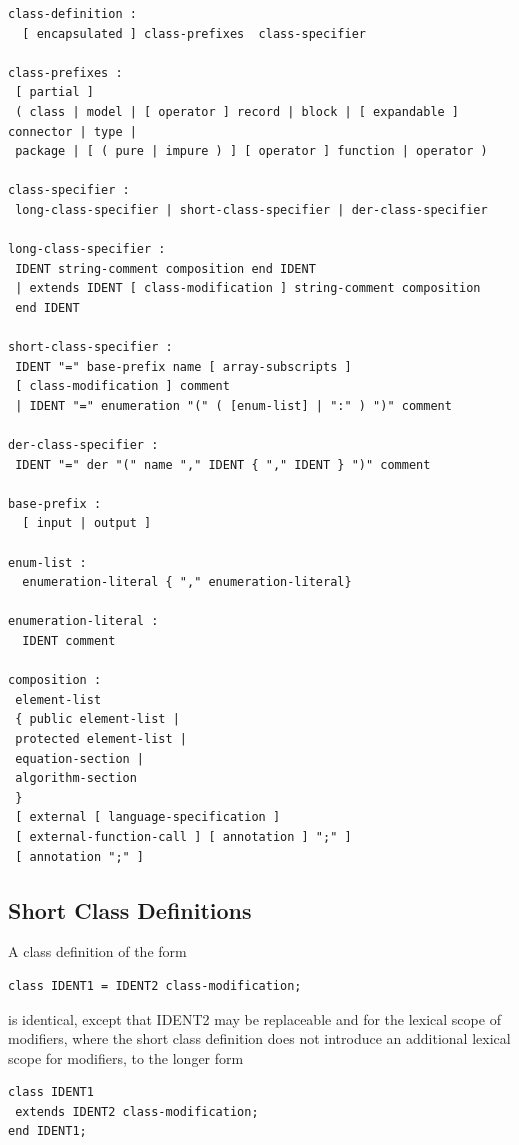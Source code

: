 \documentclass[10pt,a4paper]{report}
\begin{document}
\begin{lstlisting}[language=grammar]
class-definition : 
  [ encapsulated ] class-prefixes  class-specifier

class-prefixes :
 [ partial ]
 ( class | model | [ operator ] record | block | [ expandable ] connector | type |
 package | [ ( pure | impure ) ] [ operator ] function | operator )

class-specifier :
 long-class-specifier | short-class-specifier | der-class-specifier

long-class-specifier :
 IDENT string-comment composition end IDENT
 | extends IDENT [ class-modification ] string-comment composition
 end IDENT

short-class-specifier :
 IDENT "=" base-prefix name [ array-subscripts ]
 [ class-modification ] comment
 | IDENT "=" enumeration "(" ( [enum-list] | ":" ) ")" comment
 
der-class-specifier :
 IDENT "=" der "(" name "," IDENT { "," IDENT } ")" comment

base-prefix : 
  [ input | output ]
  
enum-list : 
  enumeration-literal { "," enumeration-literal}
  
enumeration-literal : 
  IDENT comment

composition :
 element-list
 { public element-list |
 protected element-list |
 equation-section |
 algorithm-section
 }
 [ external [ language-specification ]
 [ external-function-call ] [ annotation ] ";" ]
 [ annotation ";" ] 
\end{lstlisting}

\subsection{Short Class Definitions}

A class definition of the form

\begin{lstlisting}[language=modelica]
class IDENT1 = IDENT2 class-modification;
\end{lstlisting}

is identical, except that IDENT2 may be replaceable and for the lexical
scope of modifiers, where the short class definition does not introduce
an additional lexical scope for modifiers, to the longer form

\begin{lstlisting}[language=modelica]
class IDENT1
 extends IDENT2 class-modification;
end IDENT1;
\end{lstlisting}
\end{document}
